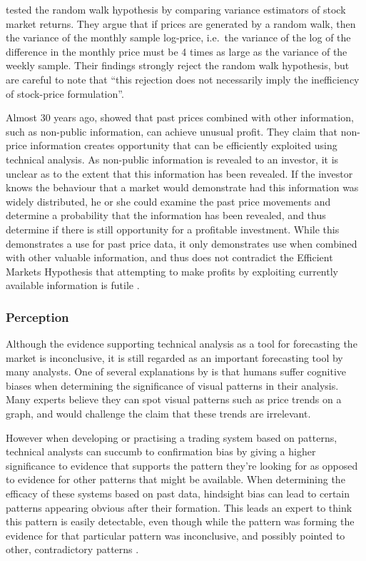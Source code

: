 \documentclass[12pt, oneside, a4paper]{article}
\theoremstyle{definition}
\begin{document}
\cite{lo1988} tested the random walk hypothesis by comparing variance estimators of stock market returns. They argue that if prices are generated by a random walk, then the variance of the monthly sample log-price, i.e.\ the variance of the log of the difference in the monthly price must be 4 times as large as the variance of the weekly sample. Their findings strongly reject the random walk hypothesis, but are careful to note that ``this rejection does not necessarily imply the inefficiency of stock-price formulation''.

Almost 30 years ago, \cite{indefenseof} showed that past prices combined with other information, such as non-public information, can achieve unusual profit. They claim that non-price information creates opportunity that can be efficiently exploited using technical analysis. As non-public information is revealed to an investor, it is unclear as to the extent that this information has been revealed. If the investor knows the behaviour that a market would demonstrate had this information was widely distributed, he or she could examine the past price movements and determine a probability that the information has been revealed, and thus determine if there is still opportunity for a profitable investment. While this demonstrates a use for past price data, it only demonstrates use when combined with other valuable information, and thus does not contradict the Efficient Markets Hypothesis that attempting to make profits by exploiting currently available information is futile \citep{taprofitability}.

\subsubsection{Perception}

\label{tahumanz}

Although the evidence supporting technical analysis as a tool for forecasting the market is inconclusive, it is still regarded as an important forecasting tool by many analysts. One of several explanations by \cite[pp.~45-71]{aronson2011evidence} is that humans suffer cognitive biases when determining the significance of visual patterns in their analysis. Many experts believe they can spot visual patterns such as price trends on a graph, and would challenge the claim that these trends are irrelevant.

However when developing or practising a trading system based on patterns, technical analysts can succumb to confirmation bias by giving a higher significance to evidence that supports the pattern they're looking for as opposed to evidence for other patterns that might be available. When determining the efficacy of these systems based on past data, hindsight bias can lead to certain patterns appearing obvious after their formation. This leads an expert to think this pattern is easily detectable, even though while the pattern was forming the evidence for that particular pattern was inconclusive, and possibly pointed to other, contradictory patterns \cite[p.~62]{aronson2011evidence}.
\end{document}

